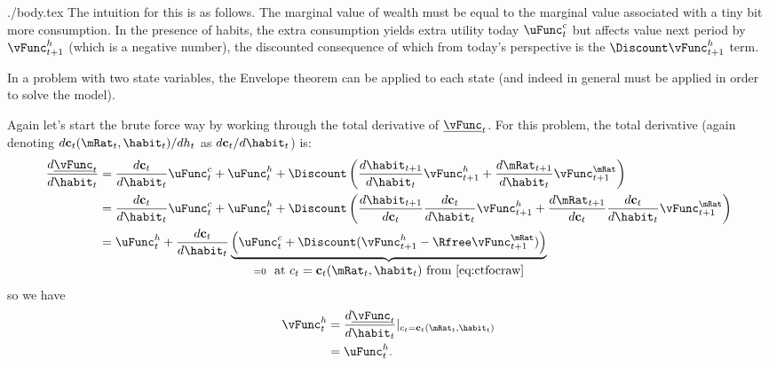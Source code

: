 \documentclass{handout}
\begin{document}
\begin{verbatimwrite}{./body.tex}
The intuition for this is as follows.  The marginal value of wealth
must be equal to the marginal value associated with a tiny bit more
consumption.  In the presence of habits, the extra consumption yields
extra utility today $\uFunc^{c}_{t}$ but affects value next period by
$\vFunc^{h}_{t+1}$ (which is a negative number), the discounted consequence
of which from today's perspective is the $\Discount \vFunc^{h}_{t+1}$ term.


In a problem with two state variables, the Envelope theorem can be
applied to each state (and indeed in general must be applied in
order to solve the model).

Again let's start the brute force way by working through the total
derivative of $\underline{\vFunc}_{t}$.  For this problem, the total derivative
(again denoting $d \mathbf{c}_{t}(\mRat_{t},\habit_{t})/d {h}_{t}$ as $d \mathbf{c}_{t}/d \habit_{t}$) is:
\begin{equation}\begin{gathered}\begin{aligned}
        \frac{d \underline{\vFunc}_{t}}{d \habit_{t}} & =  \frac{d \mathbf{c}_{t}}{d \habit_{t}} \uFunc^{c}_{t}       + \uFunc^{h}_{t} 
        + \Discount \left( \frac{d \habit_{t+1}}{d \habit_{t}}\vFunc_{t+1}^{h}
        + \frac{d \mRat_{t+1}}{d \habit_{t}} \vFunc_{t+1}^{\mRat}\right) \\
 & =  \frac{d \mathbf{c}_{t}}{d \habit_{t}} \uFunc^{c}_{t}        + \uFunc^{h}_{t} 
        + \Discount \left(\frac{d \habit_{t+1}}{d \mathbf{c}_{t}}\frac{d \mathbf{c}_{t}}{d \habit_{t}} \vFunc_{t+1}^{h}
        + \frac{d \mRat_{t+1}}{d \mathbf{c}_{t}}\frac{d \mathbf{c}_{t}}{d \habit_{t}} \vFunc_{t+1}^{\mRat} 
        \right) \\      
 & =  \uFunc^{h}_{t} + 
 \frac{d \mathbf{c}_{t}}{d \habit_{t}} \underbrace{\left(\uFunc^{c}_{t}     
        + \Discount (\vFunc_{t+1}^{h}
        - \Rfree \vFunc_{t+1}^{\mRat} )\right)}_{= 0~\mbox{ at $c_{t}=\mathbf{c}_{t}(\mRat_{t},\habit_{t})$  from \eqref{eq:ctfocraw}}}
\end{aligned}\end{gathered}\end{equation}
so we have
\begin{equation}\begin{gathered}\begin{aligned}
        \vFunc_{t}^{h} & =  \frac{d \underline{\vFunc}_{t}}{d \habit_{t}}|_{c_{t} = \mathbf{c}_{t}(\mRat_{t},\habit_{t})}
\\       & =  \uFunc_{t}^{h}.
\end{aligned}\end{gathered}\end{equation}


\end{verbatimwrite}
\end{document}
